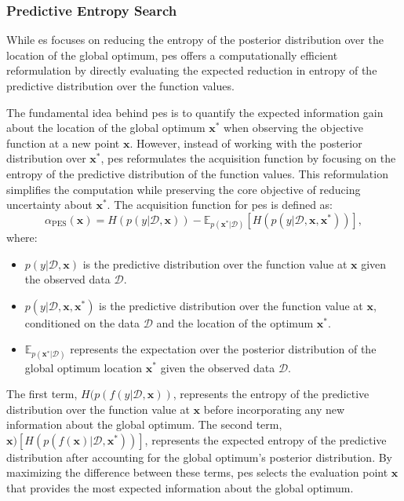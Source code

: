 \subsubsection{Predictive Entropy Search}
While \ac{es} focuses on reducing the entropy of the posterior distribution over the location of the global optimum, \acf{pes} \citep{hernandez2014predictive} offers a computationally efficient reformulation by directly evaluating the expected reduction in entropy of the predictive distribution over the function values.

The fundamental idea behind \ac{pes} is to quantify the expected information gain about the location of the global optimum $\mathbf{x}^*$ when observing the objective function at a new point $\mathbf{x}$. However, instead of working with the posterior distribution over $\mathbf{x}^*$, \ac{pes} reformulates the acquisition function by focusing on the entropy of the predictive distribution of the function values. This reformulation simplifies the computation while preserving the core objective of reducing uncertainty about $\mathbf{x}^*$. The acquisition function for \ac{pes} is defined as:
\begin{equation*}
    \alpha_{\text{PES}}(\mathbf{x}) = H(p(y \vert \mathcal{D}, \mathbf{x})) - \mathbb{E}_{p(\mathbf{x}^* \vert \mathcal{D})} \left[ H(p(y \vert \mathcal{D}, \mathbf{x}, \mathbf{x}^*)) \right],
\end{equation*}
where:
\begin{itemize}
    \item $p(y \vert \mathcal{D}, \mathbf{x})$ is the predictive distribution over the function value at $\mathbf{x}$ given the observed data $\mathcal{D}$.
    \item $p(y \vert \mathcal{D}, \mathbf{x}, \mathbf{x}^*)$ is the predictive distribution over the function value at $\mathbf{x}$, conditioned on the data $\mathcal{D}$ and the location of the optimum $\mathbf{x}^*$.
    \item $\mathbb{E}_{p(\mathbf{x}^* \vert \mathcal{D})}$ represents the expectation over the posterior distribution of the global optimum location $\mathbf{x}^*$ given the observed data $\mathcal{D}$.
\end{itemize}

The first term, $H(p(f(y \vert \mathcal{D}, \mathbf{x}))$, represents the entropy of the predictive distribution over the function value at $\mathbf{x}$ before incorporating any new information about the global optimum. The second term, $\mathbf{x}) \left[ H(p(f(\mathbf{x}) \vert \mathcal{D}, \mathbf{x}^*)) \right]$, represents the expected entropy of the predictive distribution after accounting for the global optimum's posterior distribution. By maximizing the difference between these terms, \ac{pes} selects the evaluation point $\mathbf{x}$ that provides the most expected information about the global optimum.

